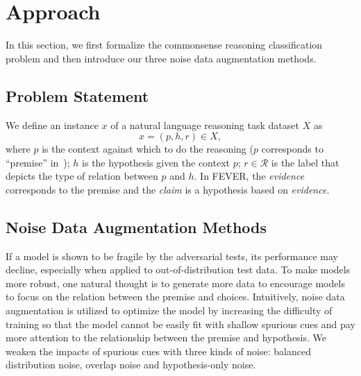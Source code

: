 \section{Approach}
\label{sec:approach}


In this section, we first formalize the commonsense reasoning classification problem
and then introduce our three noise data augmentation methods.
 
\subsection{Problem Statement}
\label{sec:problem_statement}
We define an instance $x$ of a natural language reasoning task 
dataset $X$ as
\begin{equation}
    x = (p, h, r) \in X, \label{eq:nli}
\end{equation}
\noindent
where $p$ is the context against which to do the reasoning ($p$ corresponds 
to ``premise'' in~);
$h$ is the hypothesis given the context $p$; 
$r \in \mathcal{R}$ is the label that 
depicts the type of relation between $p$ and $h$. 
In FEVER, the \textit{evidence} corresponds to the premise and the 
\textit{claim} is a hypothesis based on \textit{evidence}. 

\subsection{Noise Data Augmentation Methods}
\label{sec:noise_methods}

If a model is shown to be fragile by the adversarial tests, its performance
may decline, especially when applied to out-of-distribution
test data. To make models more robust, one natural 
thought is to generate more data to encourage models to
focus on the relation between the premise and choices. Intuitively,
noise data augmentation is utilized to optimize
the model by increasing the difficulty of training so that the model cannot be easily
fit with shallow spurious cues and pay more attention to the relationship between the 
premise and hypothesis. We weaken the impacts of spurious cues with three kinds of noise: 
balanced distribution noise, overlap noise and hypothesis-only noise. 

